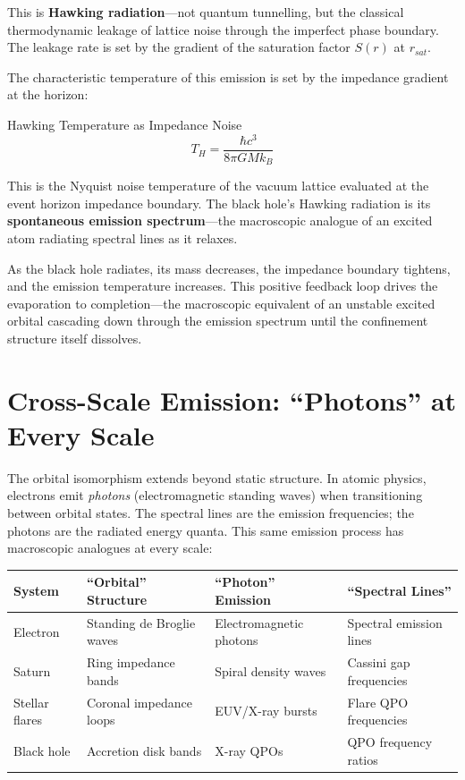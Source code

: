 This is \textbf{Hawking radiation}---not quantum tunnelling, but the classical thermodynamic leakage of lattice noise through the imperfect phase boundary. The leakage rate is set by the gradient of the saturation factor $S(r)$ at $r_{sat}$.

The characteristic temperature of this emission is set by the impedance gradient at the horizon:
\begin{resultbox}{Hawking Temperature as Impedance Noise}
\begin{equation}
    T_H = \frac{\hbar c^3}{8\pi G M k_B}
\end{equation}
\end{resultbox}

This is the Nyquist noise temperature of the vacuum lattice evaluated at the event horizon impedance boundary. The black hole's Hawking radiation is its \textbf{spontaneous emission spectrum}---the macroscopic analogue of an excited atom radiating spectral lines as it relaxes.

\medskip
As the black hole radiates, its mass decreases, the impedance boundary tightens, and the emission temperature increases. This positive feedback loop drives the evaporation to completion---the macroscopic equivalent of an unstable excited orbital cascading down through the emission spectrum until the confinement structure itself dissolves.

\section{Cross-Scale Emission: ``Photons'' at Every Scale}
\label{sec:cross_scale_emission}

The orbital isomorphism extends beyond static structure. In atomic physics, electrons emit \textit{photons} (electromagnetic standing waves) when transitioning between orbital states. The spectral lines are the emission frequencies; the photons are the radiated energy quanta. This same emission process has macroscopic analogues at every scale:

\begin{center}
\renewcommand{\arraystretch}{1.3}
\begin{tabularx}{\textwidth}{@{}l l l X@{}}
\toprule
\textbf{System} & \textbf{``Orbital'' Structure} & \textbf{``Photon'' Emission} & \textbf{``Spectral Lines''} \\
\midrule
Electron & Standing de Broglie waves & Electromagnetic photons & Spectral emission lines \\
Saturn & Ring impedance bands & Spiral density waves & Cassini gap frequencies \\
Stellar flares & Coronal impedance loops & EUV/X-ray bursts & Flare QPO frequencies \\
Black hole & Accretion disk bands & X-ray QPOs & QPO frequency ratios \\
\bottomrule
\end{tabularx}
\end{center}

